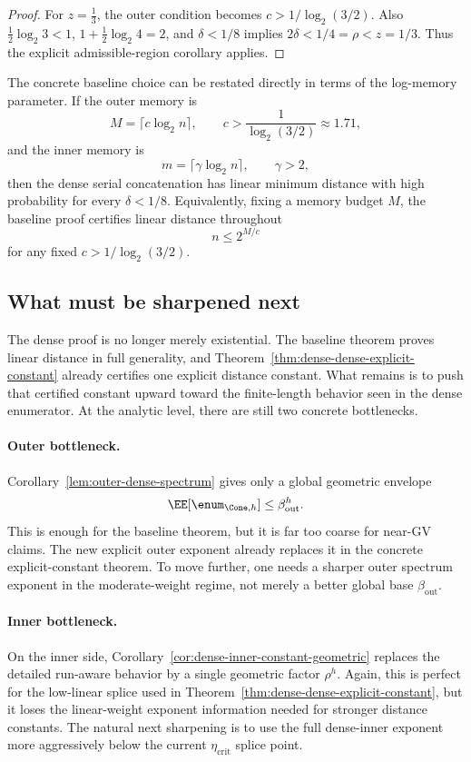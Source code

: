 \begin{proof}
For \(z=\tfrac13\), the outer condition becomes \(c>1/\log_2(3/2)\).  Also
\(\frac12\log_2 3<1\), \(1+\frac12\log_2 4=2\), and \(\delta<1/8\) implies
\(2\delta<1/4=\rho<z=1/3\).  Thus the explicit admissible-region corollary applies.
\end{proof}

\begin{remark}
\label{rem:dense-dense-memory-scaling}
The concrete baseline choice can be restated directly in terms of the log-memory parameter.  If the outer memory is
\[
M=\lceil c\log_2 n\rceil,\qquad c>\frac{1}{\log_2(3/2)}\approx 1.71,
\]
and the inner memory is
\[
m=\lceil \gamma\log_2 n\rceil,\qquad \gamma>2,
\]
then the dense serial concatenation has linear minimum distance with high probability for every \(\delta<1/8\).
Equivalently, fixing a memory budget \(M\), the baseline proof certifies linear distance throughout
\[
n \le 2^{M/c}
\]
for any fixed \(c>1/\log_2(3/2)\).
\end{remark}

\subsection{What must be sharpened next}
\label{sec:integration-dense-dense-block}

The dense proof is no longer merely existential.
The baseline theorem proves linear distance in full generality, and
Theorem~\ref{thm:dense-dense-explicit-constant} already certifies one explicit distance constant.
What remains is to push that certified constant upward toward the finite-length behavior seen in the dense enumerator.
At the analytic level, there are still two concrete bottlenecks.

\paragraph{Outer bottleneck.}
Corollary~\ref{lem:outer-dense-spectrum} gives only a global geometric envelope
\[
\EE[\enum_{\Cone,h}] \le \beta_{\mathrm{out}}^h.
\]
This is enough for the baseline theorem, but it is far too coarse for near-GV claims.
The new explicit outer exponent already replaces it in the concrete explicit-constant theorem.
To move further, one needs a sharper outer spectrum exponent in the moderate-weight regime,
not merely a better global base \(\beta_{\mathrm{out}}\).

\paragraph{Inner bottleneck.}
On the inner side, Corollary~\ref{cor:dense-inner-constant-geometric} replaces the detailed run-aware behavior by a
single geometric factor \(\rho^h\).
Again, this is perfect for the low-linear splice used in Theorem~\ref{thm:dense-dense-explicit-constant},
but it loses the linear-weight exponent information needed for stronger distance constants.
The natural next sharpening is to use the full dense-inner exponent more aggressively below the current
\(\eta_{\mathrm{crit}}\) splice point.

